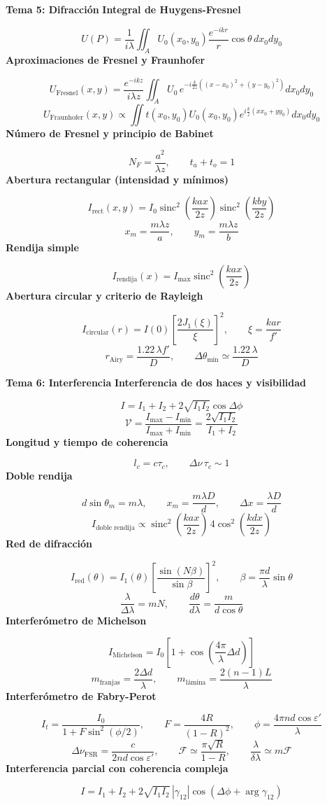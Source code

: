 \documentclass[12pt, a4paper]{article}
\theoremstyle{plain}
\theoremstyle{definition}
\theoremstyle{remark}
\newcommand{\formulaname}[1]{\textbf{#1}\par\vspace{2pt}}
\begin{document}
\begin{mdframed}[style=resultado]
\textbf{Tema 5: Difracción}
\formulaname{Integral de Huygens-Fresnel}
\[
U(P)=\frac{1}{i\lambda}\iint_A U_0(x_0,y_0)\frac{e^{-ikr}}{r}\cos\theta\,dx_0dy_0
\]
\formulaname{Aproximaciones de Fresnel y Fraunhofer}
\[
U_{\text{Fresnel}}(x,y)=\frac{e^{-ikz}}{i\lambda z}\iint_A U_0\,
e^{-i\frac{k}{2z}\left((x-x_0)^2+(y-y_0)^2\right)}dx_0dy_0
\]
\[
U_{\text{Fraunhofer}}(x,y)\propto\iint t(x_0,y_0)U_0(x_0,y_0)
e^{i\frac{k}{z}(xx_0+yy_0)}dx_0dy_0
\]
\formulaname{Número de Fresnel y principio de Babinet}
\[
N_F=\frac{a^2}{\lambda z},
\qquad
t_a+t_o=1
\]
\formulaname{Abertura rectangular (intensidad y mínimos)}
\[
I_{\text{rect}}(x,y)=I_0\operatorname{sinc}^2\!\left(\frac{kax}{2z}\right)
\operatorname{sinc}^2\!\left(\frac{kby}{2z}\right)
\]
\[
x_m=\frac{m\lambda z}{a},
\qquad
y_m=\frac{m\lambda z}{b}
\]
\formulaname{Rendija simple}
\[
I_{\text{rendija}}(x)=I_{\max}\operatorname{sinc}^2\!\left(\frac{kax}{2z}\right)
\]
\formulaname{Abertura circular y criterio de Rayleigh}
\[
I_{\text{circular}}(r)=I(0)\left[\frac{2J_1(\xi)}{\xi}\right]^2,
\qquad
\xi=\frac{kar}{f'}
\]
\[
r_{\text{Airy}}=\frac{1.22\,\lambda f'}{D},
\qquad
\Delta\theta_{\min}\simeq\frac{1.22\,\lambda}{D}
\]
\end{mdframed}

\begin{mdframed}[style=resultado]
\textbf{Tema 6: Interferencia}
\formulaname{Interferencia de dos haces y visibilidad}
\[
I=I_1+I_2+2\sqrt{I_1I_2}\cos\Delta\phi
\]
\[
\mathcal{V}=\frac{I_{\max}-I_{\min}}{I_{\max}+I_{\min}}
=\frac{2\sqrt{I_1I_2}}{I_1+I_2}
\]
\formulaname{Longitud y tiempo de coherencia}
\[
l_c=c\tau_c,
\qquad
\Delta\nu\,\tau_c\sim 1
\]
\formulaname{Doble rendija}
\[
d\sin\theta_m=m\lambda,
\qquad
x_m=\frac{m\lambda D}{d},
\qquad
\Delta x=\frac{\lambda D}{d}
\]
\[
I_{\text{doble rendija}}\propto
\operatorname{sinc}^2\!\left(\frac{kax}{2z}\right)\,
4\cos^2\!\left(\frac{kdx}{2z}\right)
\]
\formulaname{Red de difracción}
\[
I_{\text{red}}(\theta)=I_1(\theta)\left[\frac{\sin(N\beta)}{\sin\beta}\right]^2,
\qquad
\beta=\frac{\pi d}{\lambda}\sin\theta
\]
\[
\frac{\lambda}{\Delta\lambda}=mN,
\qquad
\frac{d\theta}{d\lambda}=\frac{m}{d\cos\theta}
\]
\formulaname{Interferómetro de Michelson}
\[
I_{\text{Michelson}}=I_0\left[1+\cos\!\left(\frac{4\pi}{\lambda}\Delta d\right)\right]
\]
\[
m_{\text{franjas}}=\frac{2\Delta d}{\lambda},
\qquad
m_{\text{lámina}}=\frac{2(n-1)L}{\lambda}
\]
\formulaname{Interferómetro de Fabry-Perot}
\[
I_t=\frac{I_0}{1+F\sin^2(\phi/2)},
\qquad
F=\frac{4R}{(1-R)^2},
\qquad
\phi=\frac{4\pi nd\cos\varepsilon'}{\lambda}
\]
\[
\Delta\nu_{\mathrm{FSR}}=\frac{c}{2nd\cos\varepsilon'},
\qquad
\mathcal{F}\simeq\frac{\pi\sqrt{R}}{1-R},
\qquad
\frac{\lambda}{\delta\lambda}\simeq m\mathcal{F}
\]
\formulaname{Interferencia parcial con coherencia compleja}
\[
I=I_1+I_2+2\sqrt{I_1I_2}\,|\gamma_{12}|
\cos(\Delta\phi+\arg\gamma_{12})
\]
\end{mdframed}
\end{document}
